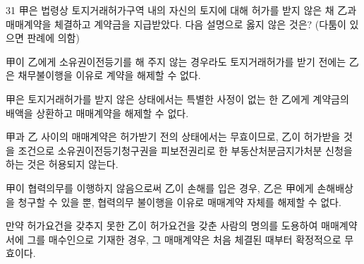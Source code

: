 \begin{question}{31}
甲은 법령상 토지거래허가구역 내의 자신의 토지에 대해 허가를 받지 않은 채 乙과 매매계약을 체결하고 계약금을 지급받았다. 다음 설명으로 옳지 않은 것은? (다툼이 있으면 판례에 의함)
\begin{choices}
  \item 甲이 乙에게 소유권이전등기를 해 주지 않는 경우라도 토지거래허가를 받기 전에는 乙은 채무불이행을 이유로 계약을 해제할 수 없다.
  \item 甲은 토지거래허가를 받지 않은 상태에서는 특별한 사정이 없는 한 乙에게 계약금의 배액을 상환하고 매매계약을 해제할 수 없다.
  \item 甲과 乙 사이의 매매계약은 허가받기 전의 상태에서는 무효이므로, 乙이 허가받을 것을 조건으로 소유권이전등기청구권을 피보전권리로 한 부동산처분금지가처분 신청을 하는 것은 허용되지 않는다.
  \item 甲이 협력의무를 이행하지 않음으로써 乙이 손해를 입은 경우, 乙은 甲에게 손해배상을 청구할 수 있을 뿐, 협력의무 불이행을 이유로 매매계약 자체를 해제할 수 없다.
  \item 만약 허가요건을 갖추지 못한 乙이 허가요건을 갖춘 사람의 명의를 도용하여 매매계약서에 그를 매수인으로 기재한 경우, 그 매매계약은 처음 체결된 때부터 확정적으로 무효이다.
\end{choices}
\end{question}

